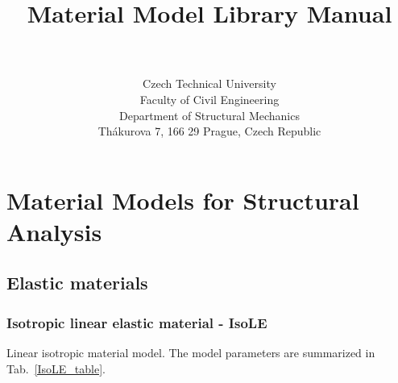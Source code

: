 \documentclass[a4paper]{article}
\begin{document}
\title{
Material Model Library Manual}
\author{\bp \\ \\
Czech Technical University\\
Faculty of Civil Engineering\\
Department of Structural Mechanics\\
Th\'akurova 7, 166 29 Prague, Czech Republic
}
\maketitle

\newpage
\tableofcontents
\listoftables
\newpage
\section{Material Models for Structural Analysis}
\subsection{Elastic materials}
\subsubsection{Isotropic linear elastic material - IsoLE}
\label{IsoLE}
Linear isotropic material model. The model parameters are summarized
in Tab.~\ref{IsoLE_table}.
\end{document}
